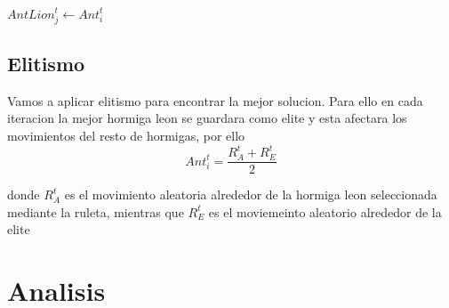   \begin{algorithm}[H]
    \begin{algorithmic}[1]
        \State $AntLion_j^t \gets Ant_i^t$
      \EndIf
    \end{algorithmic}
  \end{algorithm}

  \subsection{Elitismo}
  Vamos a aplicar elitismo para encontrar la mejor solucion. Para ello en cada iteracion la mejor hormiga leon se 
  guardara como elite y esta afectara los movimientos del resto de hormigas, por ello
  \begin{equation}
   Ant_i^t = \frac{R_A^t + R_E^t}{2}
  \end{equation}

  donde $R_A^t$ es el movimiento aleatoria alrededor de la hormiga leon seleccionada mediante la ruleta, mientras que
   $R_E^t$ es el moviemeinto aleatorio alrededor de la elite






   \newpage
   \section{Analisis}

